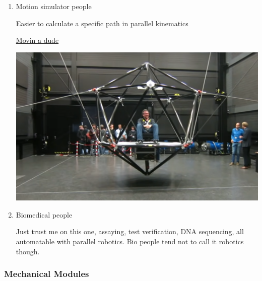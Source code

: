 \documentclass[11pt]{article}
\begin{document}
\begin{enumerate}
\begin{enumerate}
\item Motion simulator people
\label{sec:org62852a7}

Easier to calculate a specific path in parallel kinematics

\href{https://www.youtube.com/watch?v=9KMptw7ZgVI\&t=1s}{Movin a dude}

\begin{center}
\includegraphics[width=.9\linewidth]{Applications/2022-07-18_13-03-17_screenshot.png}
\end{center}

\item Biomedical people
\label{sec:org8bfd3fa}

Just trust me on this one, assaying, test verification, DNA sequencing, all automatable with parallel robotics. Bio people tend not to call it robotics though.
\end{enumerate}
\end{enumerate}

\subsubsection{Mechanical Modules}
\label{sec:org3d07e41}
\end{document}
